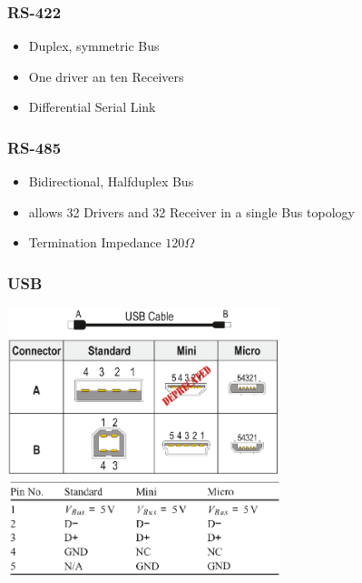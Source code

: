 \subsubsection{RS-422}
\begin{itemize}
	\item Duplex, symmetric Bus
	\item One driver an ten Receivers
	\item Differential Serial Link
\end{itemize}
\subsubsection{RS-485}
\begin{itemize}
	\item Bidirectional, Halfduplex Bus
	\item allows 32 Drivers and 32 Receiver in a single Bus topology
	\item Termination Impedance $120 \Omega$
\end{itemize}
\subsubsection{USB}
\begin{multicols}{2}
	\includegraphics[width=8cm]{images/usb_jacks.png}\\
	\includegraphics[width=8cm]{images/usb_voltage.png}\\
\end{multicols}
\clearpage
\pagebreak